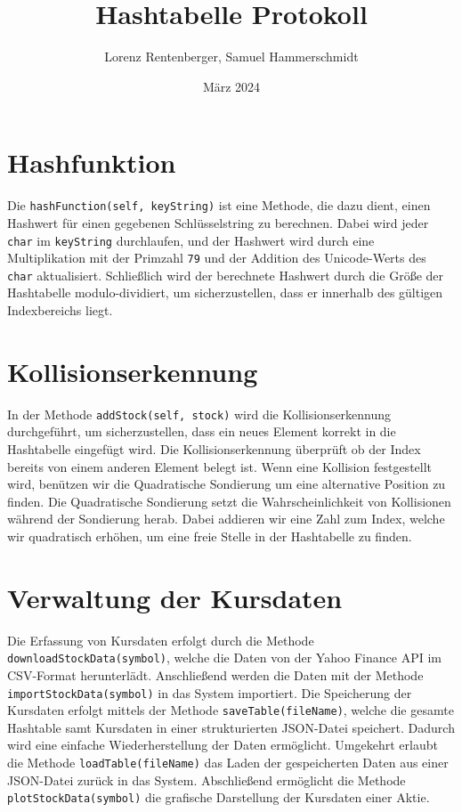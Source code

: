 \documentclass{proc}
\title{Hashtabelle Protokoll}
\author{Lorenz Rentenberger, Samuel Hammerschmidt}
\date{März 2024}
\begin{document}
\maketitle

\section*{Hashfunktion}

Die \texttt{hashFunction(self, keyString)} ist eine Methode, die dazu dient, einen Hashwert für einen gegebenen Schlüsselstring zu berechnen. 
Dabei wird jeder \texttt{char} im \texttt{keyString} durchlaufen, und der Hashwert wird durch eine Multiplikation mit der Primzahl \texttt{79} und der Addition des Unicode-Werts 
des \texttt{char} aktualisiert. Schließlich wird der berechnete Hashwert durch die Größe der Hashtabelle modulo-dividiert, um sicherzustellen, dass er innerhalb 
des gültigen Indexbereichs liegt.

\section*{Kollisionserkennung}
In der Methode \texttt{addStock(self, stock)} wird die Kollisionserkennung durchgeführt, um sicherzustellen, dass ein neues Element korrekt in die Hashtabelle eingefügt wird.
Die Kollisionserkennung überprüft ob der Index bereits von einem anderen Element belegt ist. 
Wenn eine Kollision festgestellt wird, benützen wir die Quadratische Sondierung um eine alternative Position zu finden. Die Quadratische Sondierung 
setzt die Wahrscheinlichkeit von Kollisionen während der Sondierung herab. Dabei addieren wir eine Zahl zum Index, welche wir quadratisch erhöhen, 
um eine freie Stelle in der Hashtabelle zu finden. 

\section*{Verwaltung der Kursdaten}
Die Erfassung von Kursdaten erfolgt durch die Methode \texttt{downloadStockData(symbol)}, welche die Daten von der Yahoo Finance API im CSV-Format herunterlädt. 
Anschließend werden die Daten mit der Methode \texttt{importStockData(symbol)} in das System importiert. Die Speicherung der Kursdaten erfolgt mittels der Methode 
\texttt{saveTable(fileName)}, welche die gesamte Hashtable samt Kursdaten in einer strukturierten JSON-Datei speichert. Dadurch wird eine einfache Wiederherstellung 
der Daten ermöglicht. Umgekehrt erlaubt die Methode \texttt{loadTable(fileName)} das Laden der gespeicherten Daten aus einer JSON-Datei zurück in das System. Abschließend 
ermöglicht die Methode \texttt{plotStockData(symbol)} die grafische Darstellung der Kursdaten einer Aktie.
\end{document}
